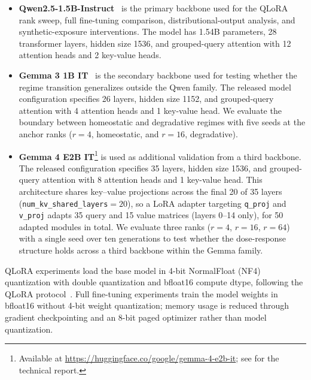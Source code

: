 \documentclass[a4paper,fleqn]{cas-dc}
\newif\ifshowchanges
\newcommand{\rev}[1]{\ifshowchanges{\color{blue}#1}\else{#1}\fi}
\begin{document}
\begin{itemize}
    \item \textbf{Qwen2.5-1.5B-Instruct}~\citep{qwen2024} is the primary
    backbone used for the QLoRA rank sweep, full fine-tuning comparison,
    distributional-output analysis, and synthetic-exposure interventions. The
    model has 1.54B parameters, 28 transformer layers, hidden size 1536, and
    grouped-query attention with 12 attention heads and 2 key-value heads.

    \item \textbf{Gemma 3 1B IT}~\citep{gemma2025} is the secondary backbone
    used for testing whether the regime transition generalizes outside the Qwen
    family. The released model configuration specifies 26 layers, hidden size
    1152, and grouped-query attention with 4 attention heads and 1 key-value
    head. We evaluate the boundary between homeostatic and degradative regimes
    with five seeds at the anchor ranks ($r=4$, homeostatic, and $r=16$, degradative).

    \item \textbf{Gemma 4 E2B IT}\footnote{Available at
    \url{https://huggingface.co/google/gemma-4-e2b-it};
    \rev{see \citet{gemma4_2026} for the technical report.}} is used as additional
    \rev{validation from a third backbone}. The released configuration specifies
    35 layers, hidden size 1536, and grouped-query attention with 8 attention
    heads and 1 key-value head. This architecture shares key--value projections
    across the final 20 of 35 layers (\texttt{num\_kv\_shared\_layers}$=20$),
    so a LoRA adapter targeting \texttt{q\_proj} and \texttt{v\_proj} adapts
    35 query and 15 value matrices (layers 0--14 only), for 50 adapted
    modules in total. We evaluate three ranks ($r=4$,
    $r=16$, $r=64$) with a single seed over ten generations to test whether
    the dose-response structure \rev{holds across a third backbone within the Gemma
    family}.
\end{itemize}

QLoRA experiments load the base model in 4-bit
NormalFloat (NF4) quantization with double quantization and bfloat16 compute
dtype, following the QLoRA protocol~\citep{dettmers2023}. Full fine-tuning
experiments train the model weights in bfloat16 without 4-bit weight
quantization; memory usage is reduced through gradient checkpointing and an
8-bit paged optimizer rather than model quantization.
\end{document}
